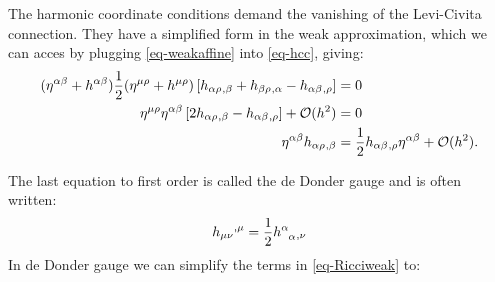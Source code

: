 \documentclass[
  letterpaper,
  DIV=11,
  numbers=noendperiod,
  oneside]{scrreprt}
\begin{document}
The harmonic coordinate conditions demand the vanishing of the
Levi-Civita connection. They have a simplified form in the weak
approximation, which we can acces by plugging \ref{eq-weakaffine} into
\ref{eq-hcc}, giving: \[
\begin{split}
    (\texttip{\texttip{\eta}{Minkoski metric tensor +---}^{\alpha\beta}}{contravariant Minkoski metric components +---}+\texttip{\texttip{h}{weak metric tensor}^{\alpha\beta}}{weak contravariant metric tensor component})\frac{1}{2}(\texttip{\texttip{\eta}{Minkoski metric tensor +---}^{\mu\rho}}{contravariant Minkoski metric components +---}+\texttip{\texttip{h}{weak metric tensor}^{\mu\rho}}{weak contravariant metric tensor component})\left[\texttip{\texttip{h}{weak metric tensor}_{\alpha\rho}}{weak covariant metric tensor component}\texttip{{}_{,\beta}}{Partial derivative}+\texttip{\texttip{h}{weak metric tensor}_{\beta\rho}}{weak covariant metric tensor component}\texttip{{}_{,\alpha}}{Partial derivative}-\texttip{\texttip{h}{weak metric tensor}_{\alpha\beta}}{weak covariant metric tensor component}\texttip{{}_{,\rho}}{Partial derivative}\right] &= 0 \\
    \texttip{\texttip{\eta}{Minkoski metric tensor +---}^{\mu\rho}}{contravariant Minkoski metric components +---}\texttip{\texttip{\eta}{Minkoski metric tensor +---}^{\alpha\beta}}{contravariant Minkoski metric components +---}\left[2\texttip{\texttip{h}{weak metric tensor}_{\alpha\rho}}{weak covariant metric tensor component}\texttip{{}_{,\beta}}{Partial derivative}-\texttip{\texttip{h}{weak metric tensor}_{\alpha\beta}}{weak covariant metric tensor component}\texttip{{}_{,\rho}}{Partial derivative}\right]+ \mathcal{O}(h^2)&= 0 \\
    \texttip{\texttip{\eta}{Minkoski metric tensor +---}^{\alpha\beta}}{contravariant Minkoski metric components +---}\texttip{\texttip{h}{weak metric tensor}_{\alpha\rho}}{weak covariant metric tensor component}\texttip{{}_{,\beta}}{Partial derivative} &= \frac{1}{2}\texttip{\texttip{h}{weak metric tensor}_{\alpha\beta}}{weak covariant metric tensor component}\texttip{{}_{,\rho}}{Partial derivative}\texttip{\texttip{\eta}{Minkoski metric tensor +---}^{\alpha\beta}}{contravariant Minkoski metric components +---} + \mathcal{O}(h^2).
\end{split}
\]

The last equation to first order is called the de Donder gauge and is
often written: \[
\texttip{\texttip{h}{weak metric tensor}_{{\mu\nu}}}{weak covariant metric tensor component}\texttip{{}^{,\mu}}{Partial derivative} = \frac{1}{2}\texttip{\texttip{h}{weak metric tensor}^{\alpha}_{\phantom{\alpha}\alpha}}{weak metric tensor trace}\texttip{{}_{,\nu}}{Partial derivative}
\] In de Donder gauge we can simplify the terms in \ref{eq-Ricciweak}
to:
\end{document}

